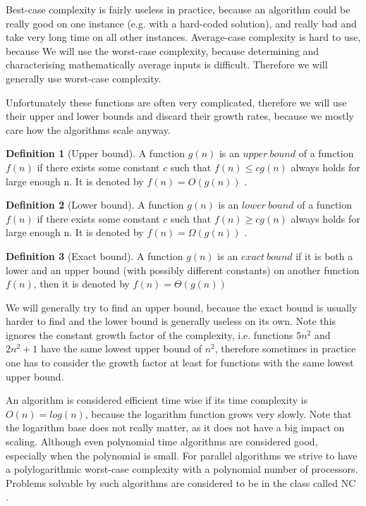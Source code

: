 \documentclass{report}
\theoremstyle{plain}
\theoremstyle{definition}
\newtheorem{definition}{Definition}
\theoremstyle{remark}
\numberwithin{definition}{chapter}
\numberwithin{example}{chapter}
\numberwithin{figure}{chapter}
\numberwithin{theorem}{chapter}
\numberwithin{lemma}{chapter}
\begin{document}
Best-case complexity is fairly useless in practice, because an algorithm could be really good on one instance (e.g. with a hard-coded solution), and really bad and take very long time on all other instances. Average-case complexity is hard to use, because 
We will use the worst-case complexity, because determining and characterising mathematically average inputs is difficult. Therefore we will generally use worst-case complexity.

Unfortunately these functions are often very complicated, therefore we will use their upper and lower bounds and discard their growth rates, because we mostly care how the algorithms scale anyway.

\begin{definition}[Upper bound]
A function $g(n)$ is an $upper \ bound$ of a function $f(n)$ if there exists some constant $c$ such that $f(n)\leq cg(n)$ always holds for large enough n. It is denoted by $f(n) = O(g(n))$ \cite{skiena504algorithm}.
\end{definition}

\begin{definition}[Lower bound]
A function $g(n)$ is an $lower \ bound$ of a function $f(n)$ if there exists some constant $c$ such that $f(n)\geq cg(n)$ always holds for large enough n. It is denoted by $f(n) = \Omega(g(n))$ \cite{skiena504algorithm}.
\end{definition}

\begin{definition}[Exact bound]
A function $g(n)$ is an $exact \ bound$ if it is both a lower and an upper bound (with possibly different constants) on another function $f(n)$, then it is denoted by $f(n) = \Theta(g(n))$
\end{definition}

We will generally try to find an upper bound, because the exact bound is usually harder to find and the lower bound is generally useless on its own. Note this ignores the constant growth factor of the complexity, i.e. functions $5n^2$ and $2n^2+1$ have the same lowest upper bound of $n^2$, therefore sometimes in practice one has to consider the growth factor at least for functions with the same lowest upper bound.

An algorithm is considered efficient time wise if its time complexity is $O(n)=log(n)$, because the logarithm function grows very slowly. Note that the logarithm base does not really matter, as it does not have a big impact on scaling. Although even polynomial time algorithms are considered good, especially when the polynomial is small. For parallel algorithms we strive to have a polylogarithmic worst-case complexity with a polynomial number of processors. Problems solvable by such algorithms are considered to be in the class called NC \cite{berman1996fundamentals}.
\end{document}
